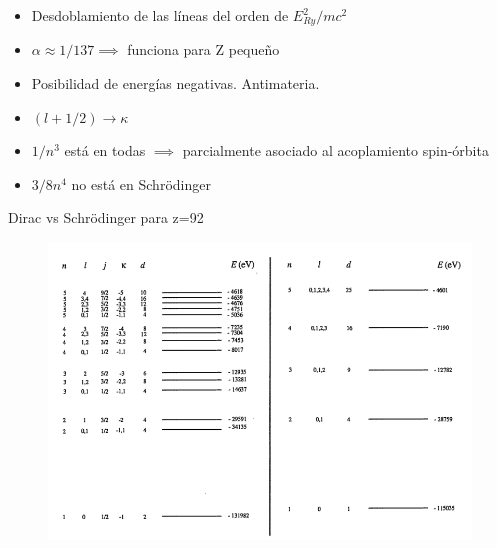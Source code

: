 \documentclass{beamer}
\begin{document}
\begin{frame}

\begin{itemize}%

 \item Desdoblamiento de las l\'ineas del orden de $E^2_{Ry}/mc^2$
 \vspace{5mm}
 \item $\alpha\approx 1/137 \implies $ funciona para Z peque\~no
 \vspace{5mm}
 \item Posibilidad de energ\'ias negativas. Antimateria.
 \vspace{5mm}
 \item $(l+1/2) \rightarrow \kappa $
  \vspace{5mm}
 \item $1/n^3$ est\'a en todas $\implies$ parcialmente asociado al acoplamiento spin-\'orbita
  \vspace{5mm}
 \item $3/8n^4$ no est\'a en Schr\"odinger
 
\end{itemize}
\end{frame}

\begin{frame}{Dirac vs Schr\"odinger para z=92}
\begin{figure}
\includegraphics[width=\textwidth,height=\textheight,keepaspectratio]{Figures/relativistic.png}
\end{figure}
\end{frame}
\end{document}
